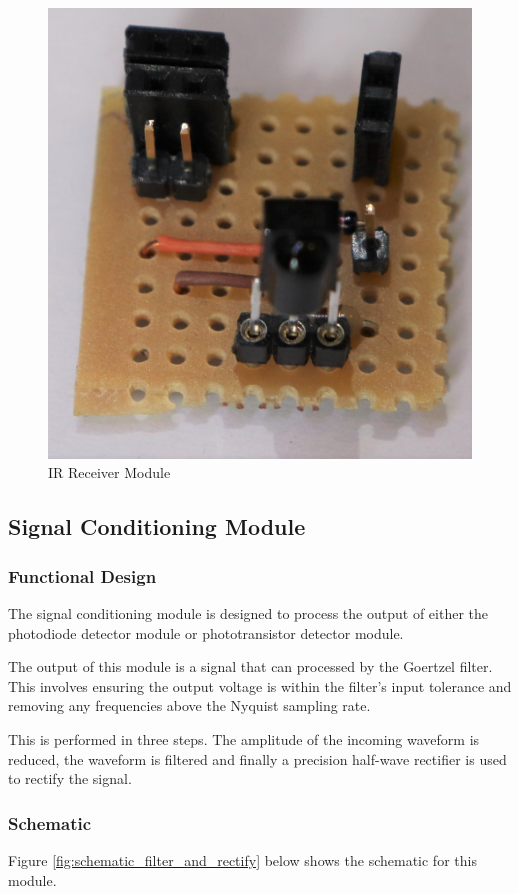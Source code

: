 \begin{figure}[H]
	\centering
	\includegraphics[width=.6\textwidth]{figures/modules/ir_receiver.jpg}
	\caption{IR Receiver Module}
	\label{fig:module_ir_receiver}
\end{figure}






\subsection{Signal Conditioning Module}

\subsubsection{Functional Design}
The signal conditioning module is designed to process the output of either the photodiode detector module or phototransistor detector module.

The output of this module is a signal that can processed by the Goertzel filter. This involves ensuring the output voltage is within the filter's input tolerance and removing any frequencies above the Nyquist sampling rate.

This is performed in three steps. The amplitude of the incoming waveform is reduced, the waveform is filtered and finally a precision half-wave rectifier is used to rectify the signal.

\subsubsection{Schematic}
Figure \ref{fig:schematic_filter_and_rectify} below shows the schematic for this module.

